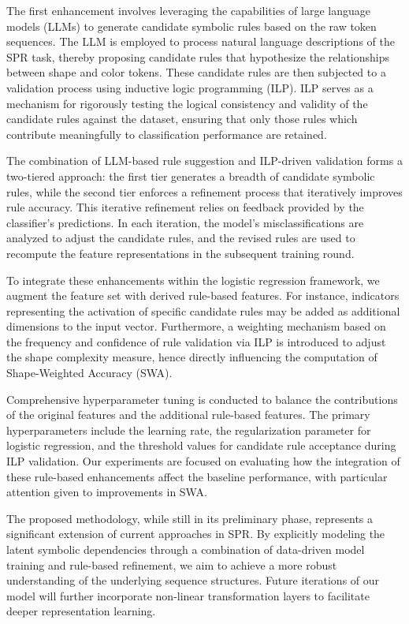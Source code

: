 \documentclass{article}
\begin{document}
The first enhancement involves leveraging the capabilities of large language models (LLMs) to generate candidate symbolic rules based on the raw token sequences. The LLM is employed to process natural language descriptions of the SPR task, thereby proposing candidate rules that hypothesize the relationships between shape and color tokens. These candidate rules are then subjected to a validation process using inductive logic programming (ILP). ILP serves as a mechanism for rigorously testing the logical consistency and validity of the candidate rules against the dataset, ensuring that only those rules which contribute meaningfully to classification performance are retained.

The combination of LLM-based rule suggestion and ILP-driven validation forms a two-tiered approach: the first tier generates a breadth of candidate symbolic rules, while the second tier enforces a refinement process that iteratively improves rule accuracy. This iterative refinement relies on feedback provided by the classifier’s predictions. In each iteration, the model’s misclassifications are analyzed to adjust the candidate rules, and the revised rules are used to recompute the feature representations in the subsequent training round.

To integrate these enhancements within the logistic regression framework, we augment the feature set with derived rule-based features. For instance, indicators representing the activation of specific candidate rules may be added as additional dimensions to the input vector. Furthermore, a weighting mechanism based on the frequency and confidence of rule validation via ILP is introduced to adjust the shape complexity measure, hence directly influencing the computation of Shape-Weighted Accuracy (SWA).

Comprehensive hyperparameter tuning is conducted to balance the contributions of the original features and the additional rule-based features. The primary hyperparameters include the learning rate, the regularization parameter for logistic regression, and the threshold values for candidate rule acceptance during ILP validation. Our experiments are focused on evaluating how the integration of these rule-based enhancements affect the baseline performance, with particular attention given to improvements in SWA.

The proposed methodology, while still in its preliminary phase, represents a significant extension of current approaches in SPR. By explicitly modeling the latent symbolic dependencies through a combination of data-driven model training and rule-based refinement, we aim to achieve a more robust understanding of the underlying sequence structures. Future iterations of our model will further incorporate non-linear transformation layers to facilitate deeper representation learning.
\end{document}
